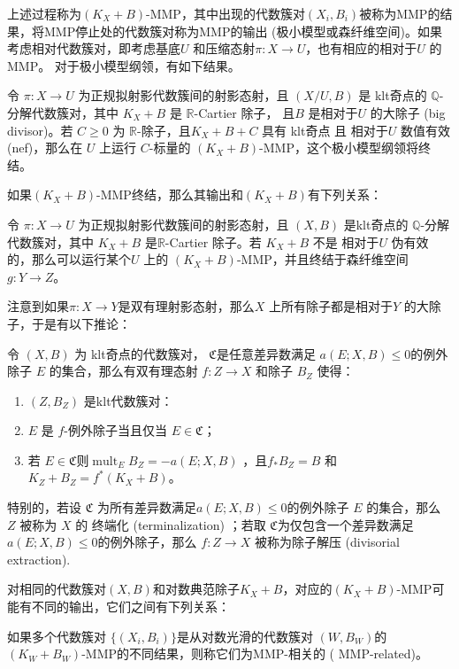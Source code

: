 上述过程称为$(K_{X}+B)$-MMP，其中出现的代数簇对$(X_{i},B_{i})$被称为MMP的结果，将MMP停止处的代数簇对称为MMP的输出 (极小模型或森纤维空间)。如果考虑相对代数簇对，即考虑基底$U$ 和压缩态射$\pi:X\to U$，也有相应的相对于$U$ 的MMP。  对于极小模型纲领，有如下结果。
\begin{theorem}
  \cite[Corollary 1.4.2]{BCHM10} 令 $ \pi: X\to U $ 为正规拟射影代数簇间的射影态射，且 $(X/U, B)$ 是 klt奇点的 $\mathbb{Q}$-分解代数簇对，其中 $K_{X}+B$ 是 $\mathbb{R}$-Cartier 除子， 且$B$ 是相对于$U$ 的大除子 (big divisor)。若 $C\geqslant0$ 为 $\mathbb{R}$-除子，且$K_{X}+B+C$ 具有 klt奇点 且 相对于$U$ 数值有效 (nef)，那么在 $U$ 上运行 $C$-标量的  $(K_{X}+B)$-MMP，这个极小模型纲领将终结。
\end{theorem}

如果$(K_{X}+B)$-MMP终结，那么其输出和$(K_{X}+B)$有下列关系：
\begin{theorem}[极小模型输出]\label{notpseudoeffmfs}
  \cite[Corollary 1.3.3]{BCHM10} 令 $ \pi: X\to U $ 为正规拟射影代数簇间的射影态射，且 $(X, B)$ 是klt奇点的 $\mathbb{Q}$-分解代数簇对，其中 $K_{X}+B$ 是$\mathbb{R}$-Cartier 除子。若 $K_{X}+B$ 不是 相对于$U$ 伪有效的，那么可以运行某个$U$ 上的  $(K_{X}+B)$-MMP，并且终结于森纤维空间$g:Y\to Z$。
\end{theorem}
注意到如果$ \pi:X \to Y$是双有理射影态射，那么$X$ 上所有除子都是相对于$Y$ 的大除子，于是有以下推论：   
\begin{corollary}\label{extraction}
  \cite[Corollary 13.7]{haconMinimalModelProgram2012} 令 $ (X,B) $ 为 klt奇点的代数簇对， $\mathfrak{C}$是任意差异数满足 $ a(E;X,B)\leqslant 0 $的例外除子 $E$ 的集合，那么有双有理态射 $ f:Z\to X $ 和除子 $ B_Z $ 使得：
  \begin{enumerate}
    \item $ (Z,B_Z) $ 是klt代数簇对：
    \item $ E $ 是 $f$-例外除子当且仅当 $ E\in \mathfrak{C} $；
    \item  若 $E \in \mathfrak{C}$则$ \operatorname{mult}_{E}B_Z=-a(E;X,B) $ ，且$ f_*B_Z=B $ 和 $ K_Z+B_Z=f^*(K_X+B) $。
  \end{enumerate}
  特别的，若设 $\mathfrak{C}$ 为所有差异数满足$a(E; X, B)\leqslant 0$的例外除子 $E$ 的集合，那么 $ Z $ 被称为 $X$ 的 终端化 (terminalization) ；若取 $\mathfrak{C}$为仅包含一个差异数满足 $a(E; X, B)\leqslant 0$的例外除子，那么 $ f: Z\to X $ 被称为除子解压 (divisorial extraction).
\end{corollary}
对相同的代数簇对$(X,B)$和对数典范除子$K_{X}+B$，对应的$(K_{X}+B)$-MMP可能有不同的输出，它们之间有下列关系：
\begin{definition}
  \cite[Definition 3.3]{brunoLogSarkisovProgram1995}
  如果多个代数簇对 $ \{(X_i,B_i)\} $是从对数光滑的代数簇对 $(W,B_{W})$的 $(K_{W}+B_{W}) $-MMP的不同结果，则称它们为MMP-相关的 ( MMP-related)。 
\end{definition}

